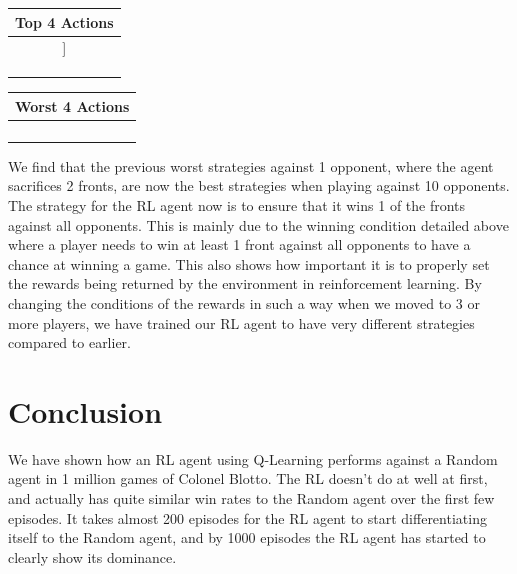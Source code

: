 \documentclass[11pt, oneside]{article}   	%
\begin{document}
\hfill 

\begin{center}
\begin{tabular}{ |c| } 
 \hline
 \textbf{Top 4 Actions} \\ 
 \hline
[10, 0, 0]] \\ 
 \hline
 [5, 0, 5] \\ 
 \hline
[9, 1, 0]\\
 \hline
[0, 10, 0]\\
 \hline
\end{tabular}
\quad
\begin{tabular}{ |c| } 
 \hline
\textbf{Worst 4 Actions} \\ 
 \hline
[4, 4, 2]\\ 
 \hline
[0, 5, 5] \\
 \hline
 [3, 3, 4]\\
 \hline
 [2, 5, 3]\\

 \hline
\end{tabular}

\end{center}

We find that the previous worst strategies against 1 opponent, where the agent sacrifices 2 fronts, are now the best strategies when playing against 10 opponents. The strategy for the RL agent now is to ensure that it wins 1 of the fronts against all opponents. This is mainly due to the winning condition detailed above where a player needs to win at least 1 front against all opponents to have a chance at winning a game. This also shows how important it is to properly set the rewards being returned by the environment in reinforcement learning. By changing the conditions of the rewards in such a way when we moved to 3 or more players, we have trained our RL agent to have very different strategies compared to earlier.

\section{Conclusion}

We have shown how an RL agent using Q-Learning performs against a Random agent in 1 million games of Colonel Blotto. The RL doesn't do at well at first, and actually has quite similar win rates to the Random agent over the first few episodes. It takes almost 200 episodes for the RL agent to start differentiating itself to the Random agent, and by 1000 episodes the RL agent has started to clearly show its dominance.
\end{document}
